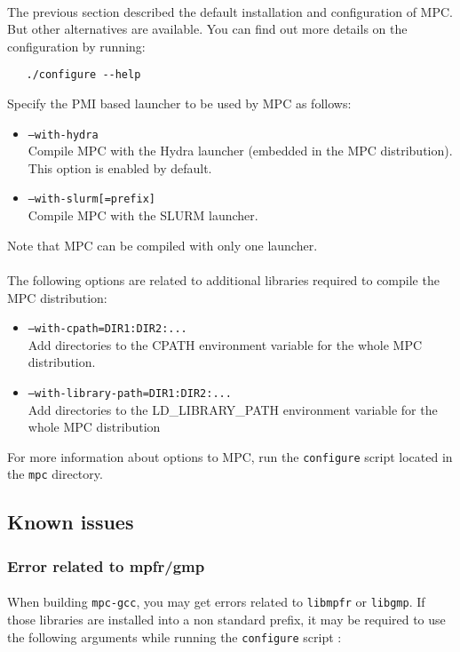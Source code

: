 \documentclass[a4paper,11pt]{article}
\begin{document}
\paragraph{}
The previous section described the default installation and configuration of MPC.
But other alternatives are available. You can find out more details on the
configuration by running:

\begin{lstlisting}
   ./configure --help
\end{lstlisting}

Specify the PMI based launcher to be used by MPC as follows:
\begin{itemize}
\item \texttt{--with-hydra} \\
	Compile MPC with the Hydra launcher (embedded in the MPC distribution).
	This option is enabled by default.
\item \texttt{--with-slurm[=prefix]} \\
	Compile MPC with the SLURM launcher.
\end{itemize}
Note that MPC can be compiled with only one launcher.
\\
\\
\indent The following options are related to additional libraries required to compile the MPC distribution:
\begin{itemize}
\item \texttt{--with-cpath=DIR1:DIR2:...}   \\
    Add directories to the CPATH environment variable for the whole MPC distribution.
\item  \texttt{--with-library-path=DIR1:DIR2:...}\\
    Add directories to the LD\_LIBRARY\_PATH environment variable for the whole MPC distribution
\end{itemize}

For more information about options to MPC, run the \texttt{configure} script located in the \texttt{mpc} directory.

\subsection{Known issues}
\label{sec:installationKnownBugs}

\subsubsection{Error related to mpfr/gmp}
\paragraph{}
When building \texttt{mpc-gcc}, you may get errors related to  \texttt{libmpfr} or \texttt{libgmp}.
If those libraries are installed into a non standard prefix, it may be required to use the following
arguments while running the \texttt{configure} script :
\end{document}

